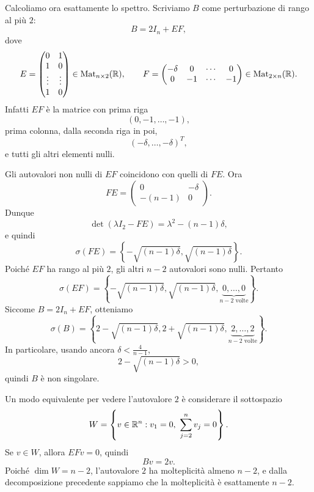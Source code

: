\documentclass[a4paper]{article}
\begin{document}
\begin{snippetsolution}{}
    Calcoliamo ora esattamente lo spettro. Scriviamo \(B\) come perturbazione di
    rango al più \(2\):
    \[
        B=2I_n+EF,
    \]
    dove
    \[
        E=
        \begin{pmatrix}
            0 & 1 \\
            1 & 0 \\
            \vdots & \vdots \\
            1 & 0
        \end{pmatrix}
        \in\operatorname{Mat}_{n\times 2}(\mathbb{R}),
        \qquad
        F=
        \begin{pmatrix}
            -\delta & 0 & \cdots & 0 \\
            0 & -1 & \cdots & -1
        \end{pmatrix}
        \in\operatorname{Mat}_{2\times n}(\mathbb{R}).
    \]
    Infatti \(EF\) è la matrice con prima riga
    \[
        (0,-1,\ldots,-1),
    \]
    prima colonna, dalla seconda riga in poi,
    \[
        (-\delta,\ldots,-\delta)^T,
    \]
    e tutti gli altri elementi nulli.

    Gli autovalori non nulli di \(EF\) coincidono con quelli di \(FE\). Ora
    \[
        FE=
        \begin{pmatrix}
            0 & -\delta \\
            -(n-1) & 0
        \end{pmatrix}.
    \]
    Dunque
    \[
        \det(\lambda I_2-FE)
        =
        \lambda^2-(n-1)\delta,
    \]
    e quindi
    \[
        \sigma(FE)=
        \left\{
            -\sqrt{(n-1)\delta},
            \sqrt{(n-1)\delta}
        \right\}.
    \]
    Poiché \(EF\) ha rango al più \(2\), gli altri \(n-2\) autovalori sono nulli.
    Pertanto
    \[
        \sigma(EF)=
        \left\{
            -\sqrt{(n-1)\delta},
            \sqrt{(n-1)\delta},
            \underbrace{0,\ldots,0}_{n-2\text{ volte}}
        \right\}.
    \]
    Siccome \(B=2I_n+EF\), otteniamo
    \[
        \sigma(B)=
        \left\{
            2-\sqrt{(n-1)\delta},
            2+\sqrt{(n-1)\delta},
            \underbrace{2,\ldots,2}_{n-2\text{ volte}}
        \right\}.
    \]
    In particolare, usando ancora \(\delta<\frac{4}{n-1}\),
    \[
        2-\sqrt{(n-1)\delta}>0,
    \]
    quindi \(B\) è non singolare.

    Un modo equivalente per vedere l'autovalore \(2\) è considerare il sottospazio
    \[
        W=
        \left\{
            v\in\mathbb{R}^n:
            v_1=0,\
            \sum_{j=2}^{n}v_j=0
        \right\}.
    \]
    Se \(v\in W\), allora \(EFv=0\), quindi
    \[
        Bv=2v.
    \]
    Poiché \(\dim W=n-2\), l'autovalore \(2\) ha molteplicità almeno \(n-2\), e
    dalla decomposizione precedente sappiamo che la molteplicità è esattamente
    \(n-2\).


\end{snippetsolution}
\end{document}

